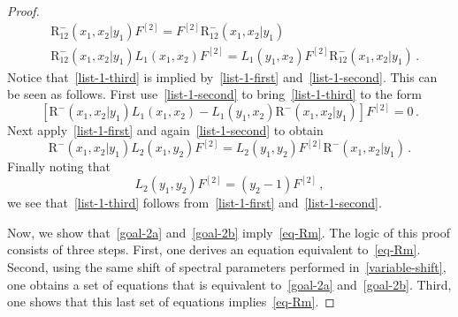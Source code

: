 \documentclass[10pt,a4paper]{amsart}
\newcommand{\abrOSCR}{\mathrm{R}}
\begin{document}
\begin{proof}
\begin{align}
			&\abrOSCR_{12}^{-}(x_1,x_2|y_1)F^{[2]}=F^{[2]}\abrOSCR_{12}^{-}(x_1,x_2|y_1)\label{list-1-second}\\
			&\abrOSCR_{12}^{-}(x_1,x_2|y_1)L_{1}(x_{1},x_{2})F^{[2]}=L_{1}(y_{1},x_{2})F^{[2]}\abrOSCR_{12}^{-}(x_1,x_2|y_1)\label{list-1-third}\,.
		\end{align}
  Notice that~\eqref{list-1-third} is implied by~\eqref{list-1-first} and~\eqref{list-1-second}. This can be seen as follows.
   First use~\eqref{list-1-second} to bring~\eqref{list-1-third} to the form
   \begin{equation}
       \left[\abrOSCR^{-}(x_1,x_2|y_1)L_{1}(x_{1},x_{2})-L_{1}(y_{1},x_{2})\abrOSCR^{-}(x_1,x_2|y_1)\right]F^{[2]}=0\,.
   \end{equation}
   Next apply~\eqref{list-1-first} and again~\eqref{list-1-second} to obtain
 \begin{equation}
     \abrOSCR^{-}(x_1,x_2|y_1)L_{2}(x_{1},y_{2})F^{[2]}=L_{2}(y_{1},y_{2})F^{[2]}\abrOSCR^{-}(x_1,x_2|y_1)\,.
   \end{equation}
Finally  noting that
\begin{equation}
    L_{2}(y_{1},y_{2})F^{[2]}=(y_{2}-1)F^{[2]}\,,
\end{equation}
we see that~\eqref{list-1-third} follows from~\eqref{list-1-first} and~\eqref{list-1-second}.



   									   
                                                  	


					
   
Now, we show that~\eqref{goal-2a} and~\eqref{goal-2b} imply~\eqref{eq-Rm}.  The logic of this proof consists of three steps. First, one derives an equation equivalent to~\eqref{eq-Rm}. Second,  using the same shift of spectral parameters performed in~\eqref{variable-shift}, one obtains a set of equations that is equivalent to~\eqref{goal-2a} and~\eqref{goal-2b}. Third, one shows that this last set of equations implies~\eqref{eq-Rm}.


\end{proof}
\end{document}
